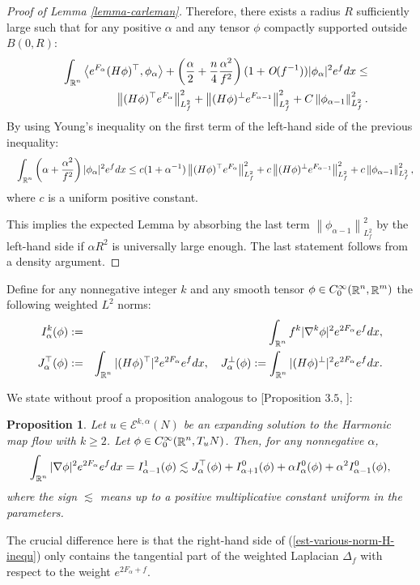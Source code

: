 \documentclass[a4paper,11pt,reqno]{amsart}
\newtheorem{prop}[defn]{Proposition}
\def\R{\mathop{\rm \mathbb{R}}\nolimits}
\newcommand{\Ent}{\mathcal{E}}
\begin{document}
\begin{proof}[Proof of Lemma \ref{lemma-carleman}]
Therefore, there exists a radius $R$ sufficiently large such that for any positive $\alpha$ and any tensor $\phi$ compactly supported outside $B(0,R)$:
\begin{eqnarray*}
&&\int_{\R^n}\left< e^{F_{\alpha}}(H\phi)^{\top},\phi_{\alpha}\right>+\left(\frac{\alpha}{2}+\frac{n}{4}\frac{\alpha^2}{f^2}\right)(1+\textit{O}(f^{-1}))|\phi_{\alpha}|^2e^fdx\leq\\
&& \left\|(H\phi)^{\top}e^{F_{\alpha}}\right\|_{L^2_f}^2+\left\|(H\phi)^{\perp}e^{F_{\alpha-1}}\right\|_{L^2_f}^2+C\left\|\phi_{\alpha-1}\right\|_{L^2_f}^2.
\end{eqnarray*}
By using Young's inequality on the first term of the left-hand side of the previous inequality:
 \begin{eqnarray*}
&&\int_{\R^n}\left(\alpha+\frac{\alpha^2}{f^2}\right)|\phi_{\alpha}|^2e^fdx\leq c(1+\alpha^{-1}) \left\|(H\phi)^{\top}e^{F_{\alpha}}\right\|_{L^2_f}^2+c\left\|(H\phi)^{\perp}e^{F_{\alpha-1}}\right\|_{L^2_f}^2+c\left\|\phi_{\alpha-1}\right\|_{L^2_f}^2,
\end{eqnarray*}
where $c$ is a uniform positive constant.

This implies the expected Lemma by absorbing the last term $\left\|\phi_{\alpha-1}\right\|_{L^2_f}^2$ by the left-hand side if $\alpha R^2$ is universally large enough. The last statement follows from a density argument.

\end{proof}

Define for any nonnegative integer $k$ and any smooth tensor $\phi\in C^{\infty}_0(\R^n,\R^m)$ the following weighted $L^2$ norms:
\begin{eqnarray*}
I^k_{\alpha}(\phi)&:=&\int_{\R^n}f^k|\nabla^k\phi|^2e^{2F_{\alpha}}e^fdx,\\
J^{\top}_{\alpha}(\phi)&:=&\int_{\R^n}|(H\phi)^{\top}|^2e^{2F_{\alpha}}e^fdx,\quad J^{\perp}_{\alpha}(\phi):=\int_{\R^n}|(H\phi)^{\perp}|^2e^{2F_{\alpha}}e^fdx.
\end{eqnarray*}

We state without proof a proposition analogous to [Proposition $3.5$, \cite{Uni-Con-Egs-Der}]: 
\begin{prop}\label{est-various-norm-H}
Let $u\in\Ent^{k,\alpha}(N)$ be an expanding solution to the Harmonic map flow with $k\geq 2$. Let $\phi\in C^{\infty}_0(\R^n,T_uN)$. Then, for any nonnegative $\alpha$,
\begin{eqnarray}
\int_{\R^n}|\nabla \phi|^2e^{2F_{\alpha}}e^fdx=I^1_{\alpha-1}(\phi)\lesssim J^{\top}_{\alpha}(\phi)+I^0_{\alpha+1}(\phi)+\alpha I^0_{\alpha}(\phi)+\alpha^2 I^0_{\alpha-1}(\phi),\label{est-various-norm-H-inequ}
\end{eqnarray}
where the sign $\lesssim$ means up to a positive multiplicative constant uniform in the parameters.

\end{prop}
The crucial difference here is that the right-hand side of (\ref{est-various-norm-H-inequ}) only contains the tangential part of the weighted Laplacian $\Delta_f$ with respect to the weight $e^{2F_{\alpha}+f}$.
\end{document}
